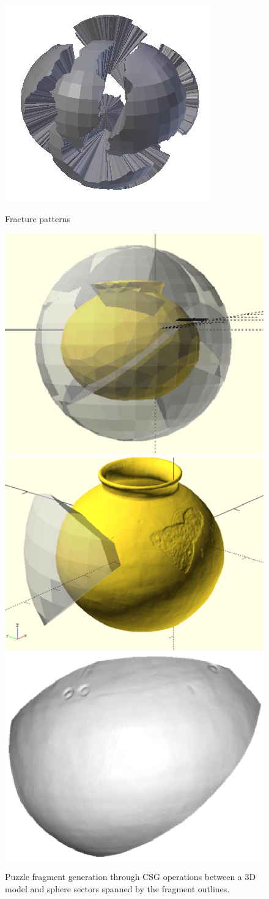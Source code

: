 \documentclass[acmlarge,screen,dvipsnames]{acmart}
\begin{document}
\begin{figure}[H]
  \hspace{0.2in}%
  {\includegraphics[width=0.30\linewidth]{images/fracturehighestamplitude}}%
  \caption{\label{fig:fracture-type-examples}%
    Fracture patterns}
\end{figure}

\greenEnd
\begin{figure}[H]
  \centering
  {\includegraphics[width=0.30\linewidth]{images/sphere}}
  \hspace{0.2in}
   {\includegraphics[width=0.30\linewidth]{images/intersection}}
   \hspace{0.2in}
  {\includegraphics[width=0.30\linewidth]{images/puzzlepiece}}

  \caption{Puzzle fragment generation through CSG operations between a 3D model and sphere sectors spanned by the fragment outlines.}
\end{figure}
\end{document}
